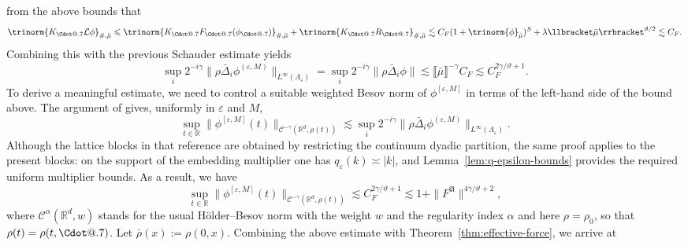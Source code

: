 \documentclass{article}
\makeatletter
\numberwithin{equation}{section}
\newcommand{\assign}{:=}
\newcommand*\Cdot{{\mathpalette\Cdot@{.7}}}
\newcommand*\Cdot@[2]{\mathbin{\vcenter{\hbox{\scalebox{#2}{\hspace{0.1mm}$\m@th#1\bullet$\hspace{0.1mm}}}}}}
\theoremstyle{plain}
\theoremstyle{definition}
\makeatother
\begin{document}
from the above bounds that
\begin{equation}
  {\trinorm{ K_{\Cdot} \mathcal{L} \phi }_{\#, \bar{\mu}}} 
  \leqslant \trinorm{ K_{\Cdot} F_{\Cdot} (\phi_{\Cdot})
  }_{\#, \bar{\mu}} + \trinorm{ K_{\Cdot} R_{\Cdot}
  }_{\#, \bar{\mu}} \lesssim C_F  (1 + \trinorm{ \phi
  }_{\bar{\mu}})^S + \lambda \llbracket \bar{\mu}
  \rrbracket^{\vartheta / 2} \lesssim C_F . \label{eq:est-Lphi}
\end{equation}
Combining this with the previous Schauder estimate yields
\begin{equation}
  \sup_i 2^{- i \gamma} \| \rho \bar{\Delta}_i \phi^{(\varepsilon, M)}
  \|_{L^{\infty} (\Lambda_{\varepsilon})} = \sup_i 2^{- i \gamma} \| \rho 
  \bar{\Delta}_i  \phi \| \lesssim \llbracket \bar{\mu} \rrbracket^{- \gamma}
  C_F \lesssim  C_F^{2 \gamma / \vartheta + 1} . \label{eq:schauder-est}
\end{equation}
To derive a meaningful estimate, we need to control a suitable weighted Besov
norm of $\phi^{[\varepsilon, M]}$ in terms of the left-hand side of the bound
above. The argument of \cite[Lemma~2.24]{MartinPerkowski2019} gives, uniformly in $\varepsilon$ and $M$,
\begin{equation}
  \sup_{t \in \mathbb{R}}
  \|\phi^{[\varepsilon,M]}(t)\|_{\mathcal C^{-\gamma}
  (\mathbb R^d,\rho(t))}
  \lesssim
  \sup_i 2^{-i\gamma}
  \|\rho\bar\Delta_i\phi^{(\varepsilon,M)}\|_{L^\infty
  (\Lambda_\varepsilon)}.
  \label{eq:weighted-extension}
\end{equation}
Although the lattice blocks in that reference are obtained by restricting the
continuum dyadic partition, the same proof applies to the present blocks: on
the support of the embedding multiplier one has
$q_\varepsilon(k)\asymp |k|$, and Lemma~\ref{lem:q-epsilon-bounds} provides
the required uniform multiplier bounds.
As a result, we have
\[ \sup_{t \in \mathbb{R}} \| \phi^{[\varepsilon, M]} (t) \|_{\mathcal{C}^{-
   \gamma} (\mathbb{R}^d, \rho (t))} \lesssim
   C_F^{2 \gamma / \vartheta + 1} \lesssim 1 + \| F^{\mathfrak{A}} \|^{4
   \gamma / \vartheta + 2}, \]
where $\mathcal{C}^{\alpha} (\mathbb{R}^d, w)$ stands for the
usual H{\"o}lder--Besov norm with the weight $w$ and the regularity index
$\alpha$ 
and here $\rho=\rho_0$, so that $\rho(t)=\rho(t,\Cdot)$. Let $\bar{\rho}(x) \assign \rho(0, x)$.
Combining the above estimate with
Theorem~\ref{thm:effective-force}, we arrive at
\end{document}
